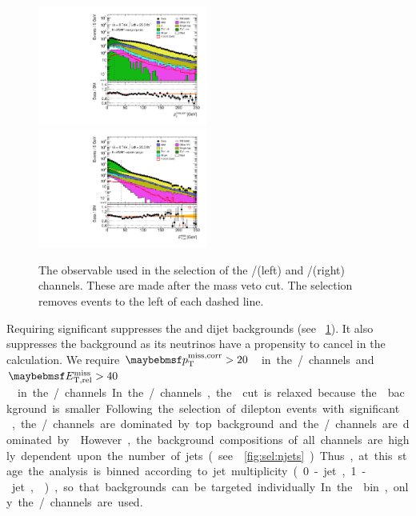 \begin{figure}
	\includegraphics[width=0.495\textwidth]{tex/selection/emme_CutZVeto_MET_TrackHWW_Clj_mh125_log}
	\hfill
	\includegraphics[width=0.495\textwidth]{tex/selection/eemm_CutZVeto_METRel_mh125_log}
	\caption{The \met observable used in the selection of the \emch/\mech (left) and 
	\eech/\mmch (right) channels. These are made after the \PZ mass veto cut. The selection 
	removes events to the left of each dashed line.}
	\label{fig:sel:met}
\end{figure}

Requiring significant \met suppresses the \DYll and dijet backgrounds (see 
\Figure~\ref{fig:sel:met}). It also suppresses the \DYtt background as its neutrinos have a 
propensity to cancel in the \met calculation. We require \unit{$\corrtrackmet > 20$}{\GeV} 
in the \emch/\mech channels and \unit{$\calometrel > 40$}{\GeV} in the \eech/\mmch channels. In 
the \emch/\mech channels, the \met cut is relaxed because the \DYll background is smaller. 

Following the selection of dilepton events with significant \met, the \emch/\mech 
channels are dominated by top background and the \eech/\mmch channels are dominated by 
\DYll. However, the background compositions of all channels are highly dependent upon the 
number of jets (see \Figure~\ref{fig:sel:njets}). Thus, at this stage the analysis is 
binned according to jet multiplicity (0-jet, 1-jet, \twojet), so that backgrounds can be 
targeted individually. In the \twojet bin, only the \emch/\mech channels are used.

